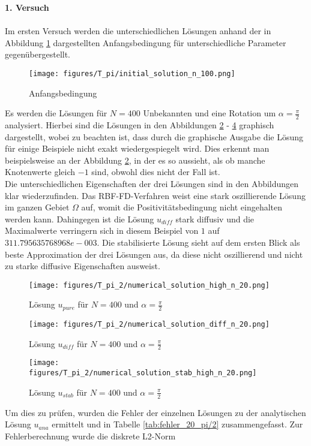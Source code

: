 \documentclass[12pt,titlepage]{article}
\begin{document}
\textbf{1. Versuch}\\\\
Im ersten Versuch werden die unterschiedlichen Lösungen anhand der in Abbildung \ref{fig:initial1} dargestellten Anfangsbedingung für unterschiedliche Parameter gegenübergestellt.
\begin{figure}[H]
\centering
 \texttt{[image: figures/T\_pi/initial\_solution\_n\_100.png]}
\caption{Anfangsbedingung}
\label{fig:initial1}
\end{figure}
\noindent
Es werden die Lösungen für $N=400$ Unbekannten und eine Rotation um $\alpha=\frac{\pi}{2}$ analysiert. Hierbei sind die Lösungen in den Abbildungen \ref{fig:pur_20} - \ref{fig:stab_20} graphisch dargestellt, wobei zu beachten ist, dass durch die graphische Ausgabe die Lösung für einige Beispiele nicht exakt wiedergespiegelt wird. Dies erkennt man beispielsweise an der Abbildung \ref{fig:pur_20}, in der es so aussieht, als ob manche Knotenwerte gleich $-1$ sind, obwohl dies nicht der Fall ist.\\
Die unterschiedlichen Eigenschaften der drei Lösungen sind in den Abbildungen klar wiederzufinden. Das RBF-FD-Verfahren weist eine stark oszillierende Lösung im ganzen Gebiet $\Omega$ auf, womit die Positivitätsbedingung nicht eingehalten werden kann. Dahingegen ist die Lösung $u_{diff}$ stark diffusiv und die Maximalwerte verringern sich in diesem Beispiel von $1$ auf $311.795635768968e-003$. Die stabilisierte Lösung sieht auf dem ersten Blick als beste Approximation der drei Lösungen aus, da diese nicht oszillierend und nicht zu starke diffusive Eigenschaften ausweist.
\begin{figure}[H]
\centering
 \texttt{[image: figures/T\_pi\_2/numerical\_solution\_high\_n\_20.png]}
\caption{Lösung $u_{pure}$ für $N=400$ und $\alpha=\frac{\pi}{2}$}
\label{fig:pur_20}
\end{figure}
\begin{figure}[H]
\centering
\texttt{[image: figures/T\_pi\_2/numerical\_solution\_diff\_n\_20.png]}
\caption{Lösung $u_{diff}$ für $N=400$ und $\alpha=\frac{\pi}{2}$}
\label{fig:diff_20}
\end{figure}
\begin{figure}[H]
\centering
\texttt{[image: figures/T\_pi\_2/numerical\_solution\_stab\_high\_n\_20.png]}
\caption{Lösung $u_{stab}$ für $N=400$ und $\alpha=\frac{\pi}{2}$}
\label{fig:stab_20}
\end{figure}
\noindent
Um dies zu prüfen, wurden die Fehler der einzelnen Lösungen zu der analytischen Lösung $u_{ana}$ ermittelt und in Tabelle \ref{tab:fehler_20_pi/2} zusammengefasst. Zur Fehlerberechnung wurde die diskrete L2-Norm 
\end{document}
